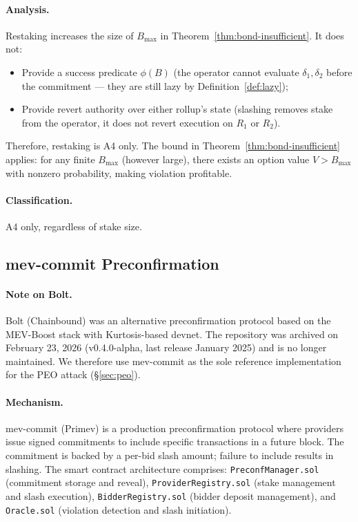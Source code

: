 \paragraph{Analysis.}
Restaking increases the size of $B_{\max}$ in Theorem~\ref{thm:bond-insufficient}.
It does not:
\begin{itemize}
  \item Provide a success predicate $\phi(B)$ (the operator cannot evaluate
    $\delta_1, \delta_2$ before the commitment --- they are still lazy by
    Definition~\ref{def:lazy});
  \item Provide revert authority over either rollup's state (slashing removes
    stake from the operator, it does not revert execution on $R_1$ or $R_2$).
\end{itemize}
Therefore, restaking is A4 only. The bound in Theorem~\ref{thm:bond-insufficient}
applies: for any finite $B_{\max}$ (however large), there exists an option value
$V > B_{\max}$ with nonzero probability, making violation profitable.

\paragraph{Classification.} A4 only, regardless of stake size.

\subsection{mev-commit Preconfirmation}
\label{app:mevcommit}

\paragraph{Note on Bolt.}
Bolt (Chainbound) was an alternative preconfirmation protocol based on the
MEV-Boost stack with Kurtosis-based devnet. The repository was archived on
February 23, 2026 (v0.4.0-alpha, last release January 2025) and is no longer
maintained. We therefore use mev-commit as the sole reference implementation
for the PEO attack (\S\ref{sec:peo}).

\paragraph{Mechanism.}
mev-commit (Primev) is a production preconfirmation protocol where providers
issue signed commitments to include specific transactions in a future block.
The commitment is backed by a per-bid slash amount; failure to include
results in slashing. The smart contract architecture comprises:
\texttt{PreconfManager.sol} (commitment storage and reveal),
\texttt{ProviderRegistry.sol} (stake management and slash execution),
\texttt{BidderRegistry.sol} (bidder deposit management), and
\texttt{Oracle.sol} (violation detection and slash initiation).

